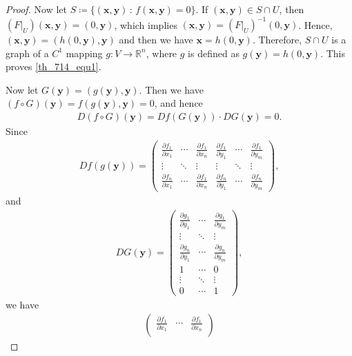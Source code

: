 \documentclass[10pt]{book}
\theoremstyle{definition}
\numberwithin{equation}{chapter}
\begin{document}
\begin{proof}
Now let $S \coloneqq \{(\mathbf{x},\mathbf{y}) \,:\, f(\mathbf{x}, \mathbf{y}) = 0\}$. If $(\mathbf{x}, \mathbf{y}) \in S \cap U$, then $(F|_{U})(\mathbf{x}, \mathbf{y}) = (0,\mathbf{y})$, which implies $(\mathbf{x}, \mathbf{y}) = \left(F|_{U}\right)^{-1}(0,\mathbf{y})$. Hence, $(\mathbf{x}, \mathbf{y}) = (h(0, \mathbf{y}), \mathbf{y})$ and then we have $\mathbf{x} = h(0, \mathbf{y})$. Therefore, $S \cap U$ is a graph of a $C^1$ mapping $g: V \to \mathbb{R}^n$, where $g$ is defined as $g(\mathbf{y}) = h(0, \mathbf{y})$. This proves \eqref{th_714_equ1}.

\medskip

Now let $G(\mathbf{y}) = (g(\mathbf{y}), \mathbf{y})$. Then we have $(f \circ G)(\mathbf{y}) = f(g(\mathbf{y}), \mathbf{y}) = 0$, and hence
\begin{align*}
    D(f \circ G)(\mathbf{y}) = Df(G(\mathbf{y})) \cdot DG(\mathbf{y}) = 0.
\end{align*}
Since
\begin{align*}
    Df(g(\mathbf{y})) = \begin{pmatrix}
        \frac{\partial f_1}{\partial x_1} & \cdots & \frac{\partial f_1}{\partial x_n} &  \frac{\partial f_1}{\partial y_1} & \cdots & \frac{\partial f_1}{\partial y_m}\\
        \vdots & \ddots & \vdots & \vdots & \ddots & \vdots \\
        \frac{\partial f_n}{\partial x_1} & \cdots & \frac{\partial f_1}{\partial x_n} & \frac{\partial f_n}{\partial y_1} & \cdots & \frac{\partial f_n}{\partial y_m}
    \end{pmatrix},
\end{align*}
and
\begin{align*}
    DG(\mathbf{y}) = \begin{pmatrix}
        \frac{\partial g_1}{\partial y_1} & \cdots & \frac{\partial g_1}{\partial y_m} \\
        \vdots & \ddots & \vdots \\
        \frac{\partial g_n}{\partial y_1} & \cdots & \frac{\partial g_n}{\partial y_m} \\
        1 & \cdots & 0 \\
        \vdots & \ddots & \vdots \\
        0 & \cdots & 1
    \end{pmatrix},
\end{align*}
we have
\begin{align*}
    \begin{pmatrix}
        \frac{\partial f_1}{\partial x_1} & \cdots & \frac{\partial f_1}{\partial x_n} \\

\end{pmatrix}
\end{align*}
\end{proof}
\end{document}
